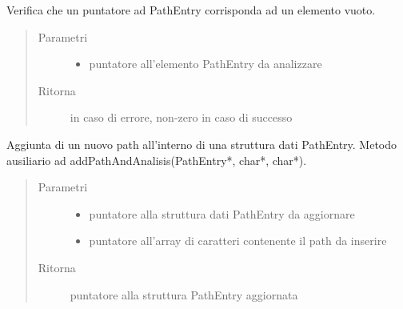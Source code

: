 \documentclass[letterpaper,10pt,italian,openany,oneside]{sphinxmanual}
\begin{document}

\begin{fulllineitems}
\label{\detokenize{code/datastructure:c.isPathEmpty}}
Verifica che un puntatore ad PathEntry corrisponda ad un elemento vuoto.
\begin{quote}\begin{description}
\item[{Parametri}] \leavevmode\begin{itemize}
\item {} 
 \textendash{} puntatore all’elemento PathEntry da analizzare

\end{itemize}

\item[{Ritorna}]  in caso di errore, non-zero in caso di successo

\end{description}\end{quote}

\end{fulllineitems}


\begin{fulllineitems}
\label{\detokenize{code/datastructure:c.addPath}}
Aggiunta di un nuovo path all’interno di una struttura dati PathEntry.
Metodo ausiliario ad addPathAndAnalisis(PathEntry*, char*, char*).
\begin{quote}\begin{description}
\item[{Parametri}] \leavevmode\begin{itemize}
\item {} 
 \textendash{} puntatore alla struttura dati PathEntry da aggiornare

\item {} 
 \textendash{} puntatore all’array di caratteri contenente il path da inserire

\end{itemize}

\item[{Ritorna}] \leavevmode
puntatore alla struttura PathEntry aggiornata

\end{description}\end{quote}

\end{fulllineitems}
\end{document}
